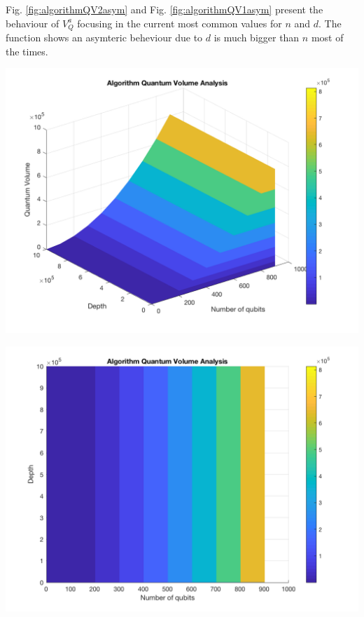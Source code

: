 \documentclass[11pt]{article}
\begin{document}
Fig. \ref{fig:algorithmQV2asym} and Fig. \ref{fig:algorithmQV1asym} present the behaviour of \(V_Q^a\)
focusing in the current most common values for \(n\) and \(d\).
The function shows an asymteric beheviour due to \(d\) is much bigger than \(n\) most of the times.



\begin{minipage}{.45\textwidth}

\centering

\begin{center}
\includegraphics[width=.9\linewidth]{V_q_analysis_asym2.png}
\end{center}

\label{fig:algorithmQV2asym}

\end{minipage}%
\hspace{1cm}
\begin{minipage}{.45\textwidth}

\begin{center}
\includegraphics[width=.9\linewidth]{V_q_analysis_asym1.png}
\end{center}

\label{fig:algorithmQV1asym}

\end{minipage}%
\end{document}

